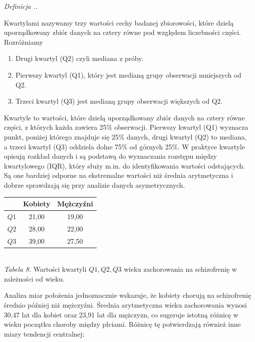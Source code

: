 \documentclass{mwart}
\newenvironment{defi}[1][]{
	\refstepcounter{definition}%
	\noindent\textit{Definicja \thesection.\thedefinition. #1}\par\nopagebreak\vspace{0.5em}\normalfont
}{\par\vspace{1em}}
\begin{document}
	\begin{defi}
		Kwartylami nazywamy trzy wartości cechy badanej zbiorowości, które dzielą uporządkowany zbiór danych na cztery równe pod względem liczebności części. Rozróżniamy
		\begin{enumerate}
			\item Drugi kwartyl (Q2) czyli mediana z próby.
			\item Pierwszy kwartyl (Q1), który jest medianą grupy obserwacji mniejszych od Q2.
			\item Trzeci kwartyl (Q3) jest medianą grupy obserwacji większych od Q2.
		\end{enumerate}
	\end{defi}
	\noindent
	Kwartyle to wartości, które dzielą uporządkowany zbiór danych na cztery równe części, z których każda zawiera 25$\%$ obserwacji. Pierwszy kwartyl (Q1) wyznacza punkt, poniżej którego znajduje się 25$\%$ danych, drugi kwartyl (Q2) to mediana, a trzeci kwartyl (Q3) oddziela dolne 75$\%$ od górnych 25$\%$. W praktyce kwartyle opisują rozkład danych i są podstawą do wyznaczania rozstępu między kwartylowego (IQR), który służy m.in. do identyfikowania wartości odstających. Są one bardziej odporne na ekstremalne wartości niż średnia arytmetyczna i dobrze sprawdzają się przy analizie danych asymetrycznych.
	\begin{center}
		\begin{tabular}{|c|c|c|}
			\hline
			&Kobiety&Mężczyźni\\
			\hline
			$Q1$&21,00&19,00\\
			\hline
			$Q2$&28,00&22,00\\
			\hline
			$Q3$&39,00&27,50\\
			\hline
		\end{tabular}\\
		\textit{Tabela 8.} Wartości kwartyli $Q1,Q2,Q3$ wieku zachorowania na schizofrenię w zależności od wieku.
	\end{center}
	Analiza miar położenia jednoznacznie wskazuje, że kobiety chorują na schizofrenię średnio później niż mężczyźni. Średnia arytmetyczna wieku zachorowania wynosi 30,47 lat dla kobiet oraz 23,91 lat dla mężczyzn, co sugeruje istotną różnicę w wieku początku choroby między płciami. Różnicę tę potwierdzają również inne miary tendencji centralnej:
\end{document}
